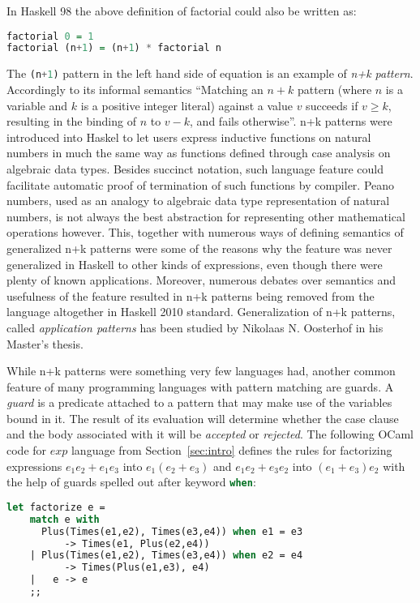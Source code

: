 \documentclass[preprint]{sigplanconf}
\DeclareRobustCommand{\codehaskell}[1]{{\lstinline[breaklines=false,language=Haskell]{#1}}}
\DeclareRobustCommand{\codeocaml}[1]{{\lstinline[breaklines=false,language=Caml]{#1}}}
\begin{document}
In Haskell 98\cite{Haskell98Book} the above definition of factorial could also 
be written as:

\begin{lstlisting}[language=Haskell]
factorial 0 = 1
factorial (n+1) = (n+1) * factorial n
\end{lstlisting}

The \codehaskell{(n+1)} pattern in the left hand side of equation is an example of 
\emph{n+k pattern}. Accordingly to its informal semantics ``Matching an $n+k$ 
pattern (where $n$ is a variable and $k$ is a positive integer literal) against 
a value $v$ succeeds if $v \ge k$, resulting in the binding of $n$ to $v-k$, and 
fails otherwise''\cite{haskell98}. n+k patterns were introduced into Haskel to 
let users express inductive functions on natural numbers in much the same way as 
functions defined through case analysis on algebraic data types. Besides 
succinct notation, such language feature could facilitate automatic proof of 
termination of such functions by compiler. Peano numbers, used as an analogy to 
algebraic data type representation of natural numbers, is not always the best 
abstraction for representing other mathematical operations however. This,  
together with numerous ways of defining semantics of generalized n+k patterns 
were some of the reasons why the feature was never generalized in Haskell to 
other kinds of expressions, even though there were plenty of known applications. 
Moreover, numerous debates over semantics and usefulness of the feature 
resulted in n+k patterns being removed from the language altogether in Haskell 
2010 standard\cite{haskell2010}. Generalization of n+k patterns, called 
\emph{application patterns} has been studied by Nikolaas N. Oosterhof in his 
Master's thesis\cite{OosterhofThesis}.

While n+k patterns were something very few languages had, another common feature of 
many programming languages with pattern matching are guards. A \emph{guard} 
is a predicate attached to a pattern that may make use of the variables bound in 
it. The result of its evaluation will determine whether the case clause and the 
body associated with it will be \emph{accepted} or \emph{rejected}. The 
following OCaml code for $exp$ language from Section~\ref{sec:intro} defines the 
rules for factorizing expressions $e_1e_2+e_1e_3$ into $e_1(e_2+e_3)$ and 
$e_1e_2+e_3e_2$ into $(e_1+e_3)e_2$ with the help of guards spelled out after 
keyword \codeocaml{when}:

\begin{lstlisting}[language=Caml,keepspaces,columns=flexible]
let factorize e =
    match e with
      Plus(Times(e1,e2), Times(e3,e4)) when e1 = e3 
          -> Times(e1, Plus(e2,e4))
    | Plus(Times(e1,e2), Times(e3,e4)) when e2 = e4 
          -> Times(Plus(e1,e3), e4)
    |   e -> e
    ;;
\end{lstlisting}
\end{document}
